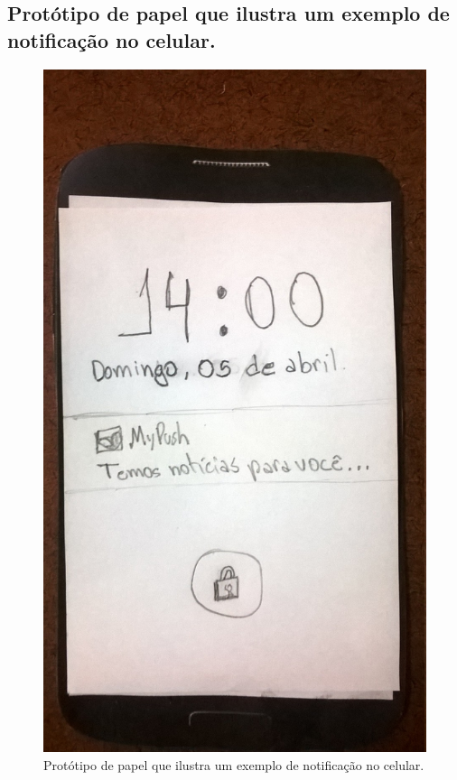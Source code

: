 \begin{apendicesenv}
    \pagebreak
    \section*{Protótipo de papel que ilustra um exemplo de notificação no celular.}
    
      \begin{figure}[!htbp]
	\centering
	\includegraphics[scale=0.32]{editaveis/figuras/prototipo_papel_v1/tela_bloqueio_notificacao}
	\caption{Protótipo de papel que ilustra um exemplo de notificação no celular.}
	\label{tela_bloqueio_notificacao_v1}
      \end{figure}
    

\end{apendicesenv}
